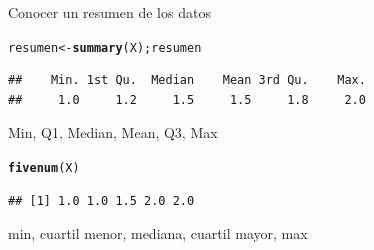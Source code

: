 \documentclass[10pt,a4paper]{article}\usepackage[]{graphicx}\usepackage[]{color}
\makeatletter
\newcommand{\hlstd}[1]{\textcolor[rgb]{0.345,0.345,0.345}{#1}}%
\newcommand{\hlkwb}[1]{\textcolor[rgb]{0.69,0.353,0.396}{#1}}%
\newcommand{\hlkwd}[1]{\textcolor[rgb]{0.737,0.353,0.396}{\textbf{#1}}}%
\newenvironment{kframe}{%
 \def\at@end@of@kframe{}%
 \ifinner\ifhmode%
  \def\at@end@of@kframe{\end{minipage}}%
  \begin{minipage}{\columnwidth}%
 \fi\fi%
 \def\FrameCommand##1{\hskip\@totalleftmargin \hskip-\fboxsep
 \colorbox{shadecolor}{##1}\hskip-\fboxsep
     \hskip-\linewidth \hskip-\@totalleftmargin \hskip\columnwidth}%
 \MakeFramed {\advance\hsize-\width
   \@totalleftmargin\z@ \linewidth\hsize
   \@setminipage}}%
 {\par\unskip\endMakeFramed%
 \at@end@of@kframe}
\newenvironment{knitrout}{}{} %
\makeatother
\begin{document}
  Conocer un resumen de los datos
\begin{knitrout}
\color{fgcolor}\begin{kframe}
\begin{alltt}
  \hlstd{resumen} \hlkwb{<-} \hlkwd{summary}\hlstd{(X); resumen}
\end{alltt}
\begin{verbatim}
##    Min. 1st Qu.  Median    Mean 3rd Qu.    Max. 
##     1.0     1.2     1.5     1.5     1.8     2.0
\end{verbatim}
\end{kframe}
\end{knitrout}
Min, Q1, Median, Mean, Q3, Max
\begin{knitrout}
\color{fgcolor}\begin{kframe}
\begin{alltt}
  \hlkwd{fivenum}\hlstd{(X)}
\end{alltt}
\begin{verbatim}
## [1] 1.0 1.0 1.5 2.0 2.0
\end{verbatim}
\end{kframe}
\end{knitrout}
  
  min, cuartil menor, mediana, cuartil mayor, max
\end{document}
